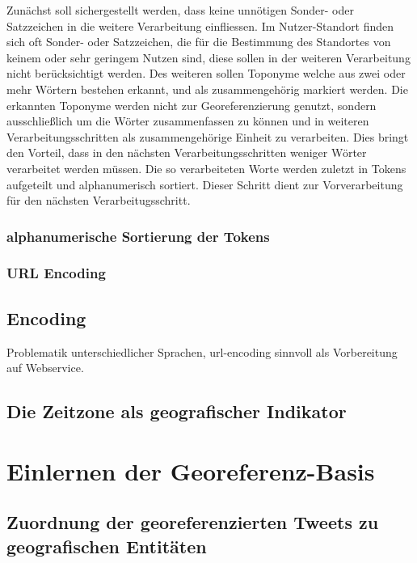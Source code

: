 		Zunächst soll sichergestellt werden, dass keine unnötigen Sonder- oder Satzzeichen in die weitere Verarbeitung einfliessen. 
		Im Nutzer-Standort finden sich oft Sonder- oder Satzzeichen, die für die Bestimmung des Standortes von keinem oder sehr geringem Nutzen sind, diese sollen in der weiteren Verarbeitung nicht berücksichtigt werden.
	  	Des weiteren sollen Toponyme welche aus zwei oder mehr Wörtern bestehen  erkannt, und als zusammengehörig markiert werden.
	  	Die erkannten Toponyme werden nicht zur Georeferenzierung genutzt, sondern ausschließlich um die Wörter zusammenfassen zu können und in weiteren Verarbeitungsschritten als zusammengehörige Einheit zu verarbeiten.
	  	Dies bringt den Vorteil, dass in den nächsten Verarbeitungsschritten weniger Wörter verarbeitet werden müssen.
	  	Die so verarbeiteten Worte werden zuletzt in Tokens aufgeteilt und alphanumerisch sortiert. 
	  	Dieser Schritt dient zur Vorverarbeitung für den nächsten Verarbeitugsschritt.

		  	\subsubsection{alphanumerische Sortierung der Tokens}

		  	\subsubsection{URL Encoding}
		  		\subsection{Encoding}
				Problematik unterschiedlicher Sprachen, 
				url-encoding sinnvoll als Vorbereitung auf Webservice. 

		  	

		\subsection{Die Zeitzone als geografischer Indikator}     

	\section{Einlernen der Georeferenz-Basis}

		\subsection{Zuordnung der georeferenzierten Tweets zu geografischen Entitäten} 

